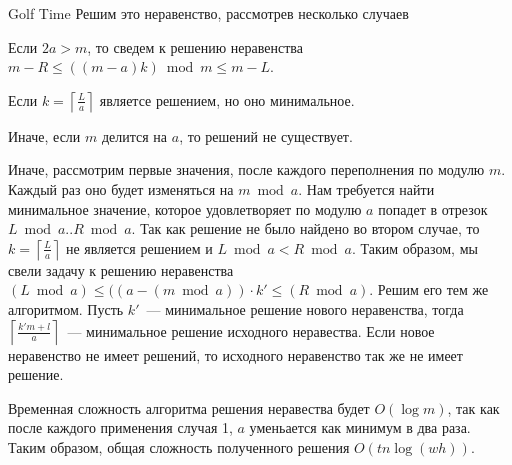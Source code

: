 \begin{tutorial}{Golf Time}
Решим это неравенство, рассмотрев несколько случаев

\begin{shortnums}
\item Если $2a > m$, то сведем к решению неравенства $m - R \le ((m - a)k) \bmod m \le m - L$.
\item Если $k=\left\lceil \frac{L}{a}\right\rceil$ являетсе решением, но оно минимальное.
\item Иначе, если $m$ делится на $a$, то решений не существует.
\item Иначе, рассмотрим первые значения, после каждого переполнения по модулю $m$. Каждый раз оно будет изменяться на $m \bmod a$. Нам требуется найти минимальное значение, которое удовлетворяет по модулю $a$ попадет в отрезок $L \bmod a..R \bmod a$. Так как решение не было найдено во втором случае, то $k=\left\lceil \frac{L}{a}\right\rceil$ не является решением и $L \bmod a < R \bmod a$. Таким образом, мы свели задачу к решению неравенства $(L \bmod a) \le ((a - (m \bmod a)) \cdot k' \le (R \bmod a)$. Решим его тем же алгоритмом. Пусть $k'$~--- минимальное решение нового неравенства, тогда $\left\lceil \frac{k'm + l}{a} \right\rceil$~--- минимальное решение исходного неравества. Если новое неравенство не имеет решений, то исходного неравенство так же не имеет решение.
\end{shortnums}

Временная сложность алгоритма решения неравества будет $O(\log m)$, так как после
каждого применения случая 1, $a$ уменьается как минимум в два раза. Таким образом, общая сложность полученного решения $O(tn\log(wh))$.



\end{tutorial}
